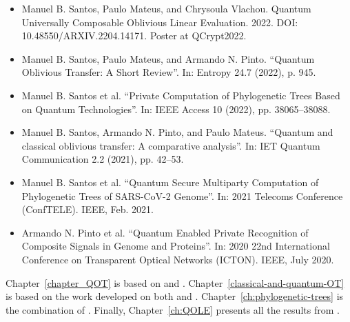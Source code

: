 \begin{itemize}
	\item\cite{SMV22} Manuel B. Santos, Paulo Mateus, and Chrysoula Vlachou. Quantum Universally
Composable Oblivious Linear Evaluation. 2022. DOI: 10.48550/ARXIV.2204.14171. Poster at QCrypt2022.	
	
	\item\cite{SMP22} Manuel B. Santos, Paulo Mateus, and Armando N. Pinto. “Quantum Oblivious Transfer:
A Short Review”. In: Entropy 24.7 (2022), p. 945.

	\item\cite{SGPM22} Manuel B. Santos et al. “Private Computation of Phylogenetic Trees Based on Quantum
Technologies”. In: IEEE Access 10 (2022), pp. 38065–38088.

	\item\cite{SPM21} Manuel B. Santos, Armando N. Pinto, and Paulo Mateus. “Quantum and classical
oblivious transfer: A comparative analysis”. In: IET Quantum Communication 2.2 (2021), pp. 42–53.

	\item\cite{SGPM21} Manuel B. Santos et al. “Quantum Secure Multiparty Computation of Phylogenetic Trees of SARS-CoV-2 Genome”. In: 2021 Telecoms Conference (ConfTELE). IEEE, Feb. 2021.

    \item\cite{POS+20} Armando N. Pinto et al. “Quantum Enabled Private Recognition of Composite Signals
in Genome and Proteins”. In: 2020 22nd International Conference on Transparent Optical
Networks (ICTON). IEEE, July 2020. 
\end{itemize}

Chapter~\ref{chapter_QOT} is based on \cite{SMP22} and \cite{SGPM22}. Chapter~\ref{classical-and-quantum-OT} is based on the work developed on both \cite{SPM21} and \cite{SGPM22}. Chapter~\ref{ch:phylogenetic-trees} is the combination of \cite{SGPM22, SGPM21, POS+20}. Finally, Chapter~\ref{ch:QOLE} presents all the results from \cite{SMV22}. 

%
%
%
